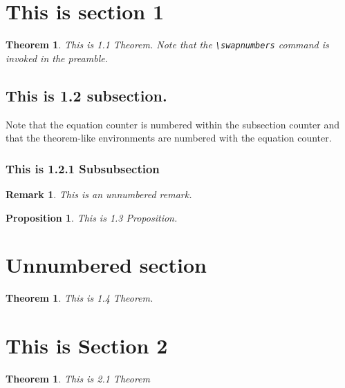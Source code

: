\documentclass[10pt]{amsart}
\numberwithin{equation}{subsection}
\theoremstyle{plain}
\newtheorem{thm}[subsection]{Theorem}
\newtheorem{prop}[subsection]{Proposition}
\newtheorem{remark}{Remark}
\theoremstyle{definition}
\theoremstyle{remark}
\begin{document}
\section{This is section 1}

\begin{thm}
This is 1.1 Theorem. Note that the \verb|\swapnumbers| command is invoked in the preamble.
\end{thm}

\subsection{This is 1.2 subsection.}

Note that the equation counter is numbered within the subsection counter and that the theorem-like environments are numbered with the equation counter.

\subsubsection{This is 1.2.1 Subsubsection}

\begin{remark}
This is an unnumbered remark.
\end{remark}

\begin{prop}
This is 1.3 Proposition.
\end{prop}

\section*{Unnumbered section}

\begin{thm}
This is 1.4 Theorem.
\end{thm}


\section{This is Section 2}

\begin{thm}
This is 2.1 Theorem
\end{thm}
\end{document}
